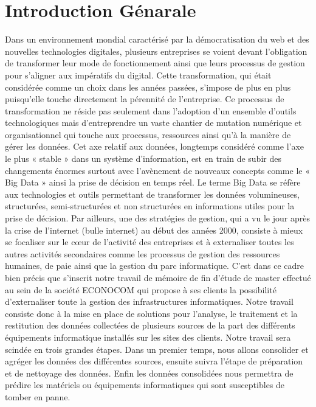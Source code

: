 \chapter*{Introduction Génarale}

Dans un environnement mondial caractérisé par la démocratisation du web et
des nouvelles technologies digitales, plusieurs entreprises se voient devant
l’obligation de transformer leur mode de fonctionnement ainsi que leurs
processus de gestion pour s’aligner aux impératifs du digital. Cette
transformation, qui était considérée comme un choix dans les années
passées, s’impose de plus en plus puisqu’elle touche directement la
pérennité de l’entreprise.
\newline
Ce processus de transformation ne réside pas seulement dans l’adoption d’un ensemble
d’outils technologiques mais d’entreprendre un vaste chantier de mutation numérique et
organisationnel qui touche aux processus, ressources ainsi qu’à la manière de gérer les
données.
\newline
Cet axe relatif aux données, longtemps considéré comme l’axe le plus « stable » dans un
système d’information, est en train de subir des changements énormes surtout avec
l’avènement de nouveaux concepts comme le « Big Data » ainsi la prise de décision en temps
réel.
\newline
Le terme Big Data se réfère aux technologies et outils permettant de transformer les données
volumineuses, structurées, semi-structurées et non structurées en informations utiles pour la
prise de décision.
\newline
Par ailleurs, une des stratégies de gestion, qui a vu le jour après la crise de l’internet (bulle
internet) au début des années 2000, consiste à mieux se focaliser sur le cœur de l’activité des
entreprises et à externaliser toutes les autres activités secondaires comme les processus de
gestion des ressources humaines, de paie ainsi que la gestion du parc informatique.
\newline
C’est dans ce cadre bien précis que s’inscrit notre travail de mémoire de fin d’étude de
master effectué au sein de la société ECONOCOM qui propose à ses clients la possibilité
d’externaliser toute la gestion des infrastructures informatiques. Notre travail consiste donc à
la mise en place de solutions pour l’analyse, le traitement et la restitution des données
collectées de plusieurs sources de la part des différents équipements informatique installés sur
les sites des clients. Notre travail sera scindée en trois grandes étapes. 
\newline
Dans un premier temps, nous allons consolider et agréger les données des différentes sources, ensuite suivra l'étape de préparation et de nettoyage des données. Enfin les données consolidées nous permettra de prédire les matériels ou équipements  informatiques qui sont susceptibles de tomber en panne.
